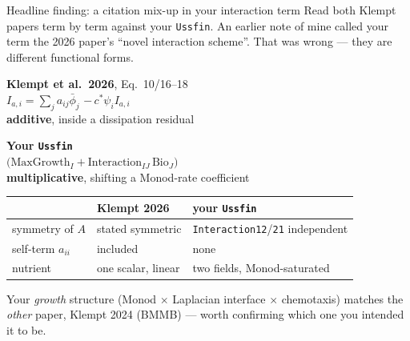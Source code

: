 \documentclass[aspectratio=169,11pt]{beamer}
\begin{document}
\begin{frame}{Headline finding: a citation mix-up in your interaction term}
\small Read both Klempt papers term by term against your \texttt{Ussfin}. An
earlier note of mine called your term the 2026 paper's ``novel interaction
scheme''. That was wrong --- they are different functional forms.
\vspace{4pt}
\begin{center}
\colorbox{gray!8}{\parbox{0.46\linewidth}{\centering\footnotesize
\textbf{Klempt et al.\ 2026}, Eq.\ 10/16--18\\[4pt]
$I_{a,i}=\sum_j a_{ij}\bar\phi_j$
\quad{}\quad
$-\,c^{*}\psi_i I_{a,i}$\\[4pt]
\textcolor{c3}{\textbf{additive}}, inside a dissipation residual}}%
\hspace{2mm}%
\colorbox{gray!8}{\parbox{0.46\linewidth}{\centering\footnotesize
\textbf{Your \texttt{Ussfin}}\\[4pt]
$\bigl(\text{MaxGrowth}_I+\text{Interaction}_{IJ}\,\text{Bio}_J\bigr)$\\[4pt]
\textcolor{c3}{\textbf{multiplicative}}, shifting a Monod-rate coefficient}}
\end{center}
\vspace{3pt}
\begin{center}\footnotesize
\begin{tabular}{@{}lll@{}}
\toprule
 & Klempt 2026 & your \texttt{Ussfin} \\
\midrule
symmetry of $A$ & stated symmetric & \texttt{Interaction12}/\texttt{21} independent \\
self-term $a_{ii}$ & included & none \\
nutrient & one scalar, linear & two fields, Monod-saturated \\
\bottomrule
\end{tabular}
\end{center}
\vspace{3pt}
{\footnotesize Your \emph{growth} structure (Monod $\times$ Laplacian interface
$\times$ chemotaxis) matches the \emph{other} paper, Klempt 2024 (BMMB) ---
worth confirming which one you intended it to be.}
\end{frame}
\end{document}
